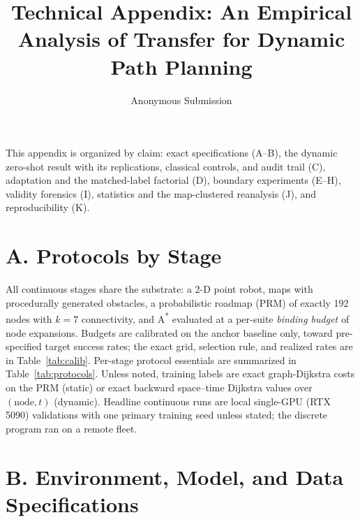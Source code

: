 \documentclass[letterpaper]{article} %
\title{Technical Appendix: An Empirical Analysis of Transfer for Dynamic Path Planning}
\author{Anonymous Submission}
\begin{document}
\maketitle

This appendix is organized by claim: exact specifications (A--B), the dynamic zero-shot result with its replications, classical controls, and audit trail (C), adaptation and the matched-label factorial (D), boundary experiments (E--H), validity forensics (I), statistics and the map-clustered reanalysis (J), and reproducibility (K).

\section{A. Protocols by Stage}

All continuous stages share the substrate: a 2-D point robot, maps with procedurally generated obstacles, a probabilistic roadmap (PRM) of exactly 192 nodes with $k{=}7$ connectivity, and A\textsuperscript{*} evaluated at a per-suite \emph{binding budget} of node expansions. Budgets are calibrated on the anchor baseline only, toward pre-specified target success rates; the exact grid, selection rule, and realized rates are in Table~\ref{tab:calib}. Per-stage protocol essentials are summarized in Table~\ref{tab:protocols}. Unless noted, training labels are exact graph-Dijkstra costs on the PRM (static) or exact backward space--time Dijkstra values over $(\text{node},t)$ (dynamic). Headline continuous runs are local single-GPU (RTX 5090) validations with one primary training seed unless stated; the discrete program ran on a remote fleet.

\section{B. Environment, Model, and Data Specifications}
\end{document}
